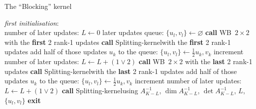 \documentclass[11pt]{article}
\numberwithin{figure}{section}
\numberwithin{table}{section}
\begin{document}
\begin{algorithm}[h]
	\caption{The ``Blocking'' kernel}\label{algo:blocking}
	\textit{first initialisation}:\\
	number of later updates: $L \gets 0$\;
	later updates queue: $\{u_l, v_l\} \gets \varnothing$\;
	 {
		\textbf{call} WB~$2\times 2$ with the  \textbf{first} 2 rank-1 updates\;
		 {
			\textbf{call} Splitting-kernel\footnotemark[1] with the \textbf{first} 2 rank-1 updates\;
			 {
				add half of those updates $u_k$ to the queue: $\{u_l,v_l\} \gets \frac{1}{2}u_k, v_k$\;
				increment number of later updates: $L \gets L + (1 \lor 2)$\;
			}
		}
		\textbf{call} WB~$2\times 2$ with the \textbf{last} 2 rank-1 updates\;
		 {
			\textbf{call} Splitting-kernel\footnotemark[1] with the \textbf{last} 2 rank-1 updates\;
			 {
				add half of those updates $u_k$ to the queue: $\{u_l,v_l\} \gets \frac{1}{2}u_k, v_k$\;
				increment number of later updates: $L \gets L + (1 \lor 2)$\;
			}
		}
		{
			\textbf{call} Splitting-kernel\footnotemark[2] using $A^{-1}_{K-L}$, $\dim A^{-1}_{K-L}$, $\det A^{-1}_{K-L} $, $L$, $\{u_l, v_l\}$\;
		}
		\textbf{exit}\;
	}
\end{algorithm}
\end{document}
